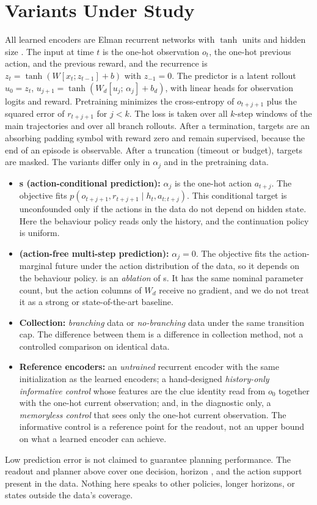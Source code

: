 \section{Variants Under Study}
\label{sec:method}

All learned encoders are Elman recurrent networks with $\tanh$ units and hidden size \DiagCfgHidden. The input at time $t$ is the one-hot observation $o_t$, the one-hot previous action, and the previous reward, and the recurrence is $z_t=\tanh(W[x_t;z_{t-1}]+b)$ with $z_{-1}=0$. The predictor is a latent rollout $u_0=z_t$, $u_{j+1}=\tanh(W_d[u_j;\,\alpha_j]+b_d)$, with linear heads for observation logits and reward. Pretraining minimizes the cross-entropy of $o_{t+j+1}$ plus the squared error of $r_{t+j+1}$ for $j<k$. The loss is taken over all $k$-step windows of the main trajectories and over all branch rollouts. After a termination, targets are an absorbing padding symbol with reward zero and remain supervised, because the end of an episode is observable. After a truncation (timeout or budget), targets are masked. The variants differ only in $\alpha_j$ and in the pretraining data.
\begin{itemize}
  \item \textbf{\acp{} (action-conditional prediction):} $\alpha_j$ is the one-hot action $a_{t+j}$. The objective fits $p(o_{t+j+1}, r_{t+j+1}\mid h_t, a_{t:t+j})$. This conditional target is unconfounded only if the actions in the data do not depend on hidden state. Here the behaviour policy reads only the history, and the continuation policy is uniform.
  \item \textbf{\msp{} (action-free multi-step prediction):} $\alpha_j=0$. The objective fits the action-marginal future under the action distribution of the data, so it depends on the behaviour policy. \msp{} is an \emph{ablation} of \acp{}. It has the same nominal parameter count, but the action columns of $W_d$ receive no gradient, and we do not treat it as a strong or state-of-the-art baseline.
  \item \textbf{Collection:} \emph{branching} data or \emph{no-branching} data under the same transition cap. The difference between them is a difference in collection method, not a controlled comparison on identical data.
  \item \textbf{Reference encoders:} an \emph{untrained} recurrent encoder with the same initialization as the learned encoders; a hand-designed \emph{history-only informative control} whose features are the clue identity read from $o_0$ together with the one-hot current observation; and, in the diagnostic only, a \emph{memoryless control} that sees only the one-hot current observation. The informative control is a reference point for the readout, not an upper bound on what a learned encoder can achieve.
\end{itemize}
Low prediction error is not claimed to guarantee planning performance. The readout and planner above cover one decision, horizon \DiagCfgPlanHorizon{}, and the action support present in the data. Nothing here speaks to other policies, longer horizons, or states outside the data's coverage.
